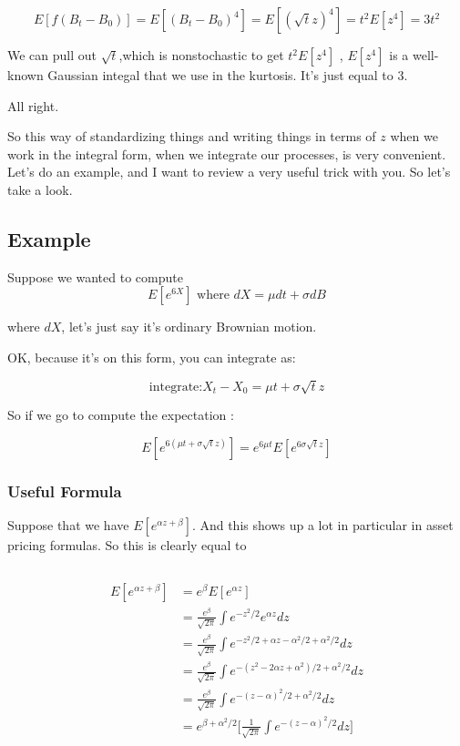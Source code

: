 \documentclass{article}
\begin{document}
 $$E[f(B_t-B_0)] = E[(B_t-B_0)^4] = E[(\sqrt{t} z)^4] = t^2 E[z^4] = 3t^2 $$ 

We can pull out $\sqrt{t}$,which is nonstochastic to get $t^2 E[z^4]$
, $E[z^4]$ is a well-known Gaussian integal that we use in the kurtosis.
It's just equal to 3.

All right.

So this way of standardizing things and writing things
in terms of $z$ when we work in the integral form,
when we integrate our processes, is very convenient.
Let's do an example, and I want to review
a very useful trick with you.
So let's take a look.

\subsection*{Example}
Suppose we wanted to compute
$$ E[e^{6X}] \text{ where }  dX = \mu dt + \sigma dB $$  

where $dX$, let's just say it's ordinary Brownian motion.


OK, because it's on this form, you can integrate as:

$$ \text{integrate:}  X_t-X_0 = \mu t + \sigma \sqrt{t} z $$

So if we go to compute the expectation :

$$ E[e^{6(\mu t + \sigma \sqrt{t} z)}] = e^{6\mu t}  E[e^{6 \sigma \sqrt{t} z}]  $$


\subsubsection*{Useful Formula}



Suppose that we have $E[e^{\alpha z + \beta}]$. And this shows up a lot in particular in asset
pricing formulas.
So this is clearly equal to

$$ $$ 

\begin{equation*} 
	\begin{split}
		E[e^{\alpha z + \beta}]  & = e^{\beta} E[e^{\alpha z }]  \\
                                 & = \frac{e^{\beta}}{\sqrt{2 \pi}} \int e^{-z^2/2}e^{\alpha z} dz \\
                                 & = \frac{e^{\beta}}{\sqrt{2 \pi}} \int e^{-z^2/2 + \alpha z - \alpha^2/2 + \alpha^2/2 } dz \\
                                 & = \frac{e^{\beta}}{\sqrt{2 \pi}} \int e^{-(z^2 - 2 \alpha z + \alpha^2)/2 + \alpha^2/2 } dz \\
                                 & = \frac{e^{\beta}}{\sqrt{2 \pi}} \int e^{-(z-\alpha)^2/2 + \alpha^2/2} dz \\
                                  & = e^{\beta+ \alpha^2/2} \Big[\frac{1}{\sqrt{2 \pi}} \int e^{-(z-\alpha)^2/2 } dz \Big]
	\end{split}
\end{equation*}
\end{document}
